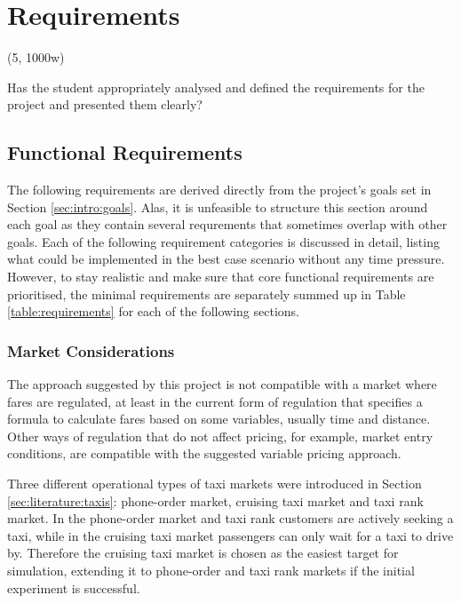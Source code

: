 \newpage
\section{Requirements}
\label{sec:requirements}

(5, 1000w)

Has the student appropriately analysed and defined the requirements for the
project and presented them clearly?


\subsection{Functional Requirements}
\label{sec:requirements:simulation}

The following requirements are derived directly from the project's goals set in
Section \ref{sec:intro:goals}. Alas, it is unfeasible to structure this section
around each goal as they contain several requrements that sometimes overlap
with other goals. Each of the following requirement categories is discussed in
detail, listing what could be implemented in the best case scenario without any
time pressure. However, to stay realistic and make sure that core functional
requirements are prioritised, the minimal requirements are separately summed up
in Table \ref{table:requirements} for each of the following sections.


\subsubsection{Market Considerations}

The approach suggested by this project is not compatible with a market where
fares are regulated, at least in the current form of regulation that specifies
a formula to calculate fares based on some variables, usually time and
distance. Other ways of regulation that do not affect pricing, for example,
market entry conditions, are compatible with the suggested variable pricing
approach.

Three different operational types of taxi markets were introduced in Section
\ref{sec:literature:taxis}: phone-order market, cruising taxi market and taxi
rank market. In the phone-order market and taxi rank customers are actively
seeking a taxi, while in the cruising taxi market passengers can only wait for
a taxi to drive by. Therefore the cruising taxi market is chosen as the easiest
target for simulation, extending it to phone-order and taxi rank markets if the
initial experiment is successful.

